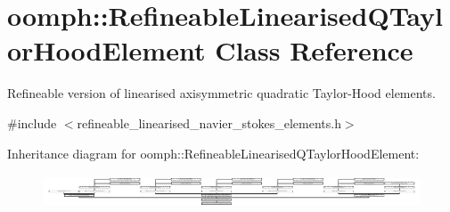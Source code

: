 \hypertarget{classoomph_1_1RefineableLinearisedQTaylorHoodElement}{}\section{oomph\+:\+:Refineable\+Linearised\+Q\+Taylor\+Hood\+Element Class Reference}
\label{classoomph_1_1RefineableLinearisedQTaylorHoodElement}


Refineable version of linearised axisymmetric quadratic Taylor-\/\+Hood elements.  




{\ttfamily \#include $<$refineable\+\_\+linearised\+\_\+navier\+\_\+stokes\+\_\+elements.\+h$>$}

Inheritance diagram for oomph\+:\+:Refineable\+Linearised\+Q\+Taylor\+Hood\+Element\+:\begin{figure}[H]
\begin{center}
\leavevmode
\includegraphics[height=0.995935cm]{classoomph_1_1RefineableLinearisedQTaylorHoodElement}
\end{center}
\end{figure}

